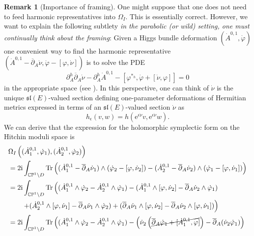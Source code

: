 \documentclass[12pt,letterpaper,reqno]{amsart}
\theoremstyle{remark}
\theoremstyle{definition}
\newtheorem{rem}[thm]{Remark}
\numberwithin{thm}{section}
\numberwithin{equation}{section}
\numberwithin{figure}{section}
\newcommand{\CP}{\ensuremath{\mathbb {CP}}}
\newcommand{\delbar}{\ensuremath{\overline{\partial}}}
\newcommand{\I}{{\mathrm i}}
\newcommand{\e}{{\mathrm e}}
\newcommand{\eps}{\epsilon}
\newcommand{\del}{{\partial}}
\DeclareMathOperator{\Tr}{Tr}
\begin{document}
\begin{rem}[Importance of framing]
One might suppose that one does not need to feed harmonic representatives into $\Omega_I$. This is essentially correct.
However, we want to explain the following subtlety \emph{in the parabolic (or wild) setting, one must continually think about the framing}:
Given a Higgs bundle deformation $(\dot{A}^{0,1}, \dot{\varphi})$ one convenient way to find the harmonic representative $(\dot{A}^{0,1}-\delbar_A \dot{\nu}, \dot{\varphi} - [\varphi, \dot{\nu}])$ is to solve the PDE 
\begin{equation}\label{eq:ingaugetriple}
 \del_A^h \delbar_A \dot{\nu} - \del_A^h \dot{A}^{0,1} - \left[\varphi^{*_h}, \dot{\varphi} + [\dot{\nu}, \varphi]\right]=0
\end{equation}
in the appropriate space (see \cite{FMSW}).
In this perspective, one can think of  $\dot{\nu}$ is the unique  $\mathfrak{sl}(E)$-valued section defining one-parameter deformations of Hermitian metrics expressed in terms of an $\mathfrak{sl}(E)$-valued section $\dot{\nu}$ as
\begin{equation*}
 h_\eps(v,w) = h(\e^{\eps \dot{\nu}} v, \e^{\eps \dot{\nu}} w).
\end{equation*}
We can derive that 
the expression for the holomorphic symplectic form on the Hitchin moduli space is 
\begin{align*}
   & \Omega_I \left((\dot{A}^{0,1}_1, \dot{\varphi}_1), (\dot{A}^{0,1}_2, \dot{\varphi}_2)\right)\\  \nonumber
  &=2\I \int_{\CP^1 \setminus D} \Tr \left( (\dot{A}^{0,1}_1 - \delbar_A \dot{\nu}_1) \wedge (\dot{\varphi}_2 - [\varphi, \dot{\nu}_2]) -  
   (\dot{A}^{0,1}_2 - \delbar_A \dot{\nu}_2) \wedge (\dot{\varphi}_1 - [\varphi, \dot{\nu}_1])
  \right)\\
   &=2\I \int_{\CP^1 \setminus D} \Tr \left( (\dot{A}^{0,1}_1 \wedge \dot{\varphi}_2 
   -\dot{A}^{0,1}_2 \wedge \dot{\varphi}_1)
   - (\dot{A}^{0,1}_1 \wedge [\varphi, \dot{\nu}_2] - \delbar_A \dot{\nu}_2 \wedge \dot{\varphi}_1) \right.\\
   &  \qquad \left.+(\dot{A}^{0,1}_2\wedge [\varphi, \dot{\nu}_1] - \delbar_A \dot{\nu}_1 \wedge \dot{\varphi}_2) + (\delbar_A \dot{\nu}_1 \wedge [\varphi, \dot{\nu}_2] - \delbar_A \dot{\nu}_2 \wedge [\varphi, \dot{\nu}_1]) \right)\\
     &= 2\I \int_{\CP^1 \setminus D} \Tr \left( (\dot{A}^{0,1}_1 \wedge \dot{\varphi}_2 
   -\dot{A}^{0,1}_2 \wedge \dot{\varphi}_1)
   -   \left(\dot{\nu}_2  \left(\cancel{ \delbar_A \dot{\varphi}_1 + [\dot{A}^{0,1}_1,\varphi] } \right)- \delbar_A(\dot{\nu}_2 \dot{\varphi}_1)\right)\right.\\

\end{align*}
\end{rem}
\end{document}
